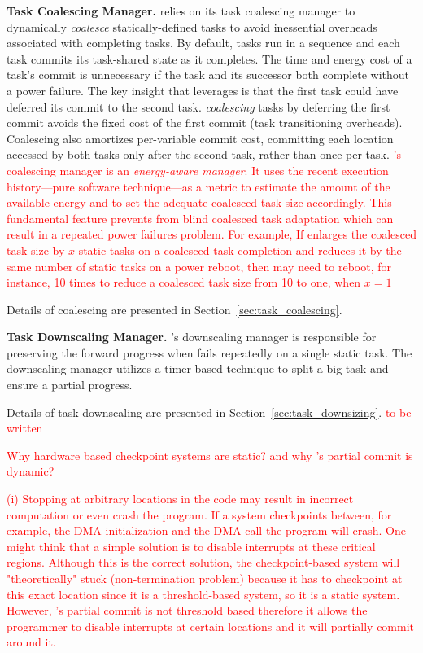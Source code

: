 \textbf{\sys Task Coalescing Manager.} \sys relies on its task coalescing manager to dynamically {\em coalesce} statically\hyp{}defined tasks to avoid inessential overheads associated with completing tasks. By default, tasks run in a sequence and each task commits its task-shared state as it completes.  The time and energy cost of a task's commit is unnecessary if the task and its successor both complete without a power failure. The key insight that \sys leverages is that the first task could have deferred its commit to the second task. {\em coalescing} tasks by deferring the first commit avoids the fixed cost of the first commit (task transitioning overheads). Coalescing also amortizes per-variable commit cost, committing each location accessed by both tasks only after the second task, rather than once per task. \textcolor{red}{\sys's coalescing manager is an \emph{energy-aware manager}. It uses the recent execution history---pure software technique---as a metric to estimate the amount of the available energy and to set the adequate coalesced task size accordingly. This fundamental feature prevents \sys from blind coalesced task adaptation which can result in a repeated power failures problem. For example, If \sys enlarges the coalesced task size by $x$ static tasks on a coalesced task completion and reduces it by the same number of static tasks on a power reboot, then \sys may need to reboot, for instance, 10 times to reduce a coalesced task size from 10 to one, when $x=1$}


Details of coalescing are presented in Section~\ref{sec:task_coalescing}.

\textbf{\sys Task Downscaling Manager.} \sys's downscaling manager is responsible for preserving the forward progress when \sys fails repeatedly on a single static task. The downscaling manager utilizes a timer-based technique to split a big task and ensure a partial progress. 

 Details of task downscaling are presented in Section~\ref{sec:task_downsizing}. \textcolor{red}{to be written}
 
 \textcolor{red}{Why hardware based checkpoint systems are static? and why \sys's partial commit is dynamic?}

\textcolor{red}{(i) Stopping at arbitrary locations in the code may result in incorrect computation or even crash the program. If a system checkpoints between, for example, the DMA initialization and the DMA call the program will crash. One might think that a simple solution is to disable interrupts at these critical regions. Although this is the correct solution, the checkpoint-based system will "theoretically" stuck (non-termination problem) because it has to checkpoint at this exact location since it is a threshold-based system, so it is a static system. However, \sys's partial commit is not threshold based therefore it allows the programmer to disable interrupts at certain locations and it will partially commit around it.}

